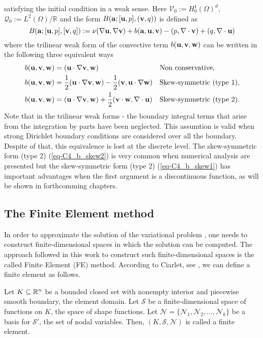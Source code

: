 satisfying the initial condition  in a weak sense. Here $\mathcal{V}_0:={H}_0^1(\Omega)^d$, $\mathcal{Q}_0:=L^2(\Omega)/\mathbb{R}$ and the form $B({{\bf a}};[{\bf u},p],({\bf v},q))$ is defined as 
\begin{equation}
\label{eq-C2_bilinear}
B({\bf a};[{\bf u},p],[{\bf v},q]):=\nu(\nabla{\bf u},\nabla{\bf v})+b({\bf a},{\bf u},{\bf v})-(p,\nabla\cdot{\bf v})+(q,\nabla\cdot{\bf u})
\end{equation}
where the trilinear weak form of the convective term $b({\bf u},{\bf v},{\bf w})$ can be written in the following three equivalent ways
\begin{align}
\label{eq-C2_b_noskew}
&b({\bf u},{\bf v},{\bf w})=({\bf u}\cdot\nabla{\bf v},{\bf w})&&\mbox{Non conservative},\\
\label{eq-C2_b_skew1}
&b({\bf u},{\bf v},\mathbf{w})=\frac{1}{2}({\bf u}\cdot\nabla{\bf v},\mathbf{w})-\frac{1}{2}({\bf v},{\bf u}\cdot\nabla\mathbf{w})&&\mbox{Skew-symmetric (type 1)},\\
\label{eq-C2_b_skew2}
&b({\bf u},{\bf v},\mathbf{w})=({\bf u}\cdot\nabla{\bf v},\mathbf{w})+\frac{1}{2}({\bf v}\cdot\mathbf{w},\nabla\cdot{\bf u})&&\mbox{Skew-symmetric (type 2)}.
\end{align}
Note that in the trilinear weak forms - the boundary integral terms that arise from the integration by parts have been neglected. This assumtion is valid when strong Dirichlet boundary conditions are considered over all the boundary. Despite of that, this equivalence is lost at the discrete level. The skew-symmetric form (type 2) (\ref{eq-C4_b_skew2}) is very common when numerical analysis are presented \cite{Badia2013Convergence,Burman2009,guermond_faedogalerkin_2007} but the skew-symmetric form (type 2) (\ref{eq-C4_b_skew1}) has important advantages when the first argument is a discontinuous function, as will be shown in forthcomming chapters.

\subsection{The Finite Element method}
\label{subsec-variational_finite_element}
In order to approximate the solution of the variational problem , one needs to construct finite-dimensional spaces in which the solution can be computed. The approach followed in this work to construct such finite-dimensional spaces is the called Finite Element (FE) method. According to Ciarlet, see \cite{ciarlet}, we can define a finite element as follows.

Let $ K\subseteq\mathbb{R}^n $ be a bounded closed set with nonempty interior and piecewise smooth boundary, the element domain. Let $ \mathcal{S} $ be a finite-dimensional space of functions on $ K $, the space of shape functions. Let $ \mathcal{N}=\{\mathcal{N}_1,\mathcal{N}_2,...,\mathcal{N}_k\} $ be a basis for $ \mathcal{S}' $, the set of nodal variables. Then, $ (K,\mathcal{S},\mathcal{N}) $ is called a finite element.

